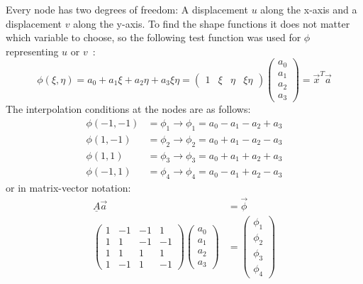   Every node has two degrees of freedom: A displacement $u$ along the x-axis and a displacement $v$ along the y-axis. To find the shape functions it does not matter which variable to choose, so the following test function was used for $\phi$ representing $u$ or $v$~\cite{steinke2005finite}:
  \begin{equation}\label{eq:q4basis}
  \phi(\xi,\eta) = a_0 + a_1\xi + a_2\eta + a_3\xi\eta = \begin{pmatrix}
  1&\xi&\eta&\xi\eta
  \end{pmatrix}\begin{pmatrix}
  a_0\\a_1\\a_2\\a_3
  \end{pmatrix} = \vec{x}^T\vec{a}
  \end{equation}
  The interpolation conditions at the nodes are as follows:
  \begin{align}
  \phi(-1,-1) &= \phi_1 \rightarrow \phi_1 = a_0 -a_1 -a_2 +a_3 \nonumber\\
  \phi(1,-1) &= \phi_2 \rightarrow \phi_2 = a_0 +a_1 -a_2 -a_3 \nonumber\\
  \phi(1,1) &= \phi_3 \rightarrow \phi_3 = a_0 +a_1 +a_2 +a_3 \nonumber\\
  \phi(-1,1) &= \phi_4 \rightarrow \phi_4 = a_0 -a_1 +a_2 -a_3
  \end{align}
  or in matrix-vector notation:
  \begin{align}
  \underline{A}\vec{a} &= \vec{\phi} \nonumber\\
  \begin{pmatrix}
  1 &-1&-1& 1\\
  1 & 1&-1&-1\\
  1 & 1& 1& 1\\
  1 &-1& 1&-1
  \end{pmatrix} \begin{pmatrix}
  a_0\\a_1\\a_2\\a_3
  \end{pmatrix} &= \begin{pmatrix}
  \phi_1\\\phi_2\\\phi_3\\\phi_4
  \end{pmatrix}
  \end{align}
